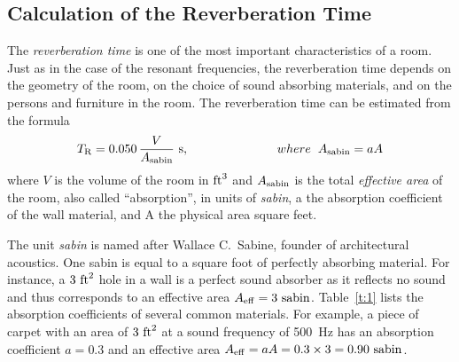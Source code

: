 \documentclass[11pt]{NSF}
\def\be{\begin{equation}}
\def\ee{\end{equation}}
\begin{document}
\subsection{Calculation of the Reverberation Time}

The {\em reverberation time} is one of the most important characteristics of
a room. Just as in the case of the resonant frequencies, the
reverberation time depends on the geometry of the room, on the choice of
sound absorbing materials, and on the persons and furniture in the room.
The reverberation time can be estimated from the formula 
%
\be
T_{\rm R} = 0.050\,\frac{V}{A_{\rm sabin}}~{\rm s}, \rule{2.5cm}{0.0mm} where \rule{0.2cm}{0.0mm} A_{\rm sabin} = aA
\label{e:TR}
\ee
%
where $V$ is the volume of the room in ${\rm ft}^3$ and $A_{\rm
sabin}$ is the total {\em effective area} of the room, also called
``absorption”, in units of {\em sabin},  a the absorption coefficient of the wall material, and A the physical area square feet. 

The unit {\em sabin} is named after Wallace C.~Sabine, founder of
architectural acoustics. One sabin is equal to a square foot of
perfectly absorbing material. For instance, a $3~{\rm ft}^2$ 
hole in a wall is a perfect sound absorber as it reflects no sound 
and thus corresponds to an effective area 
$A_{\rm eff} = 3~{\rm sabin}$. 
Table~\ref{t:1} lists the absorption
coefficients of several common materials. For example, a piece of
carpet with an area of $3~{\rm ft}^2$ at a sound frequency of 
500~Hz has an absorption coefficient $a = 0.3$ and an effective 
area $A_{\rm eff} = a A = 0.3\times 3= 0.90~{\rm sabin}$.
\end{document}
